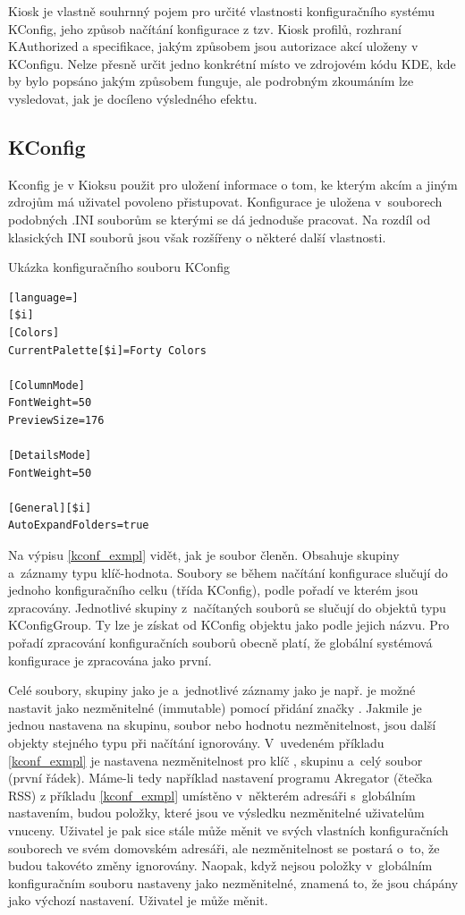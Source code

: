 Kiosk je vlastně souhrnný pojem pro určité vlastnosti konfiguračního systému KConfig, jeho způsob načítání konfigurace z tzv. Kiosk profilů, rozhraní KAuthorized a specifikace, jakým způsobem jsou autorizace akcí uloženy v KConfigu. Nelze přesně určit jedno konkrétní místo ve zdrojovém kódu KDE, kde by bylo popsáno jakým způsobem funguje, ale podrobným zkoumáním lze vysledovat, jak je docíleno výsledného efektu.

\subsection*{KConfig}
Kconfig je v Kioksu použit pro uložení informace o tom, ke kterým akcím a jiným zdrojům má uživatel povoleno přistupovat. Konfigurace je uložena v~souborech podobných .INI souborům se kterými se dá jednoduše pracovat. Na rozdíl od klasických INI souborů jsou však rozšířeny o některé další vlastnosti.\cite{wikiINIfiles}
\begin{mylisting}
\caption{Ukázka konfiguračního souboru KConfig}
\label{kconf_exmpl}
\begin{lstlisting}[language=]
[$i]
[Colors]
CurrentPalette[$i]=Forty Colors

[ColumnMode]
FontWeight=50
PreviewSize=176

[DetailsMode]
FontWeight=50

[General][$i]
AutoExpandFolders=true
\end{lstlisting}
\end{mylisting}

Na výpisu \ref{kconf_exmpl} vidět, jak je soubor členěn. Obsahuje skupiny a~záznamy typu klíč-hodnota. Soubory se během načítání konfigurace slučují do jednoho konfiguračního celku (třída KConfig), podle pořadí ve kterém jsou zpracovány. Jednotlivé skupiny z~načítaných souborů se slučují do objektů typu KConfigGroup. Ty lze je získat od KConfig objektu jako podle jejich názvu. Pro pořadí zpracování konfiguračních souborů obecně platí, že globální systémová konfigurace je zpracována jako první.

Celé soubory, skupiny jako je  a~jednotlivé záznamy jako je např. \linebreak{} je možné nastavit jako nezměnitelné (immutable) pomocí přidání značky \cppc{[\$i]}. Jakmile je jednou nastavena na skupinu, soubor nebo hodnotu nezměnitelnost, jsou další objekty stejného typu při načítání ignorovány. V~uvedeném příkladu \ref{kconf_exmpl} je nastavena nezměnitelnost pro klíč , skupinu  a~celý soubor (první řádek). Máme-li tedy například nastavení programu Akregator (čtečka RSS) z příkladu \ref{kconf_exmpl} umístěno v~některém adresáři s~globálním nastavením, budou položky, které jsou ve výsledku nezměnitelné uživatelům vnuceny. Uživatel je pak sice stále může měnit ve svých vlastních konfiguračních souborech ve svém domovském adresáři, ale nezměnitelnost se postará o~to, že budou takovéto změny ignorovány. Naopak, když nejsou položky v~globálním konfiguračním souboru nastaveny jako nezměnitelné, znamená to, že jsou chápány jako výchozí nastavení. Uživatel je může měnit.

